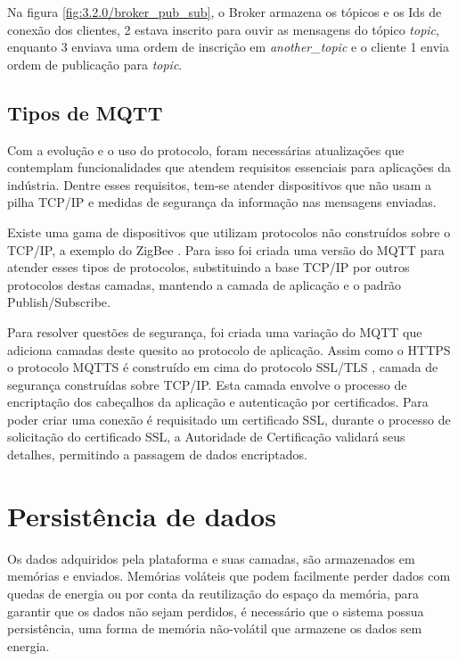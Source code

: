 Na figura \ref{fig:3.2.0/broker_pub_sub}, o Broker armazena os tópicos e os Ids de conexão dos clientes, 2 estava inscrito para ouvir as mensagens do tópico \textit{topic}, enquanto 3 enviava uma ordem de inscrição em \textit{another\_topic} e o cliente 1 envia ordem de publicação para \textit{topic}.


\subsection{Tipos de MQTT}
\label{subsection:tipos_mqtt}

Com a evolução e o uso do protocolo, foram necessárias atualizações que contemplam funcionalidades que atendem  requisitos essenciais para aplicações da indústria. Dentre esses requisitos, tem-se atender dispositivos que não usam a pilha TCP/IP e medidas de segurança da informação nas mensagens enviadas. 

Existe uma gama de dispositivos que utilizam protocolos não construídos sobre o TCP/IP, a exemplo do ZigBee \cite{zigbee}. Para isso foi criada uma versão do MQTT para atender esses tipos de protocolos, substituindo a base TCP/IP por outros protocolos destas camadas, mantendo a camada de aplicação e o padrão Publish/Subscribe.

Para resolver questões de segurança, foi criada uma variação do MQTT que adiciona camadas deste quesito ao protocolo de aplicação. Assim como o HTTPS o protocolo MQTTS é construído em cima do protocolo SSL/TLS \cite{ssl}, camada de segurança construídas sobre TCP/IP. Esta camada envolve o processo de encriptação dos cabeçalhos da aplicação e autenticação por certificados. Para poder criar uma conexão é requisitado um certificado SSL, durante o processo de solicitação do certificado SSL, a Autoridade de Certificação validará seus detalhes, permitindo a passagem de dados encriptados.

\section{Persistência de dados}
\label{section:persistencia}

Os dados adquiridos pela plataforma e suas camadas, são armazenados em memórias e enviados. Memórias voláteis que podem facilmente perder dados com quedas de energia ou por conta da reutilização do espaço da memória, para garantir que os dados não sejam perdidos, é necessário que o sistema possua persistência, uma forma de memória não-volátil que armazene os dados sem energia.


